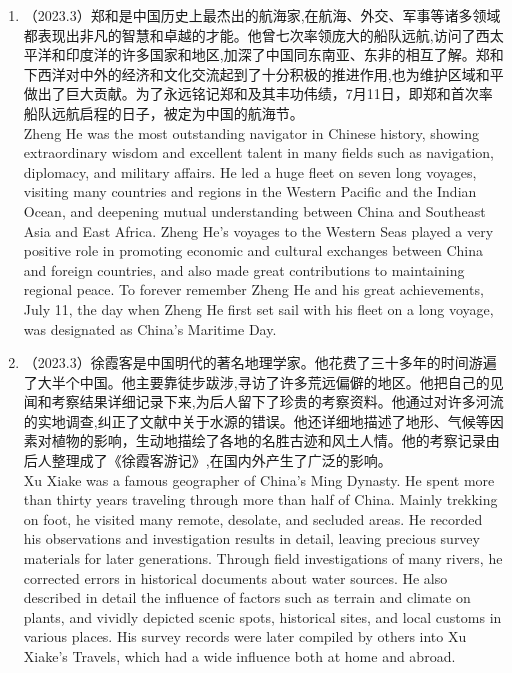 ﻿\documentclass[lang=cn,11pt]{elegantbook}
\begin{document}
\begin{enumerate}
    \item （2023.3）郑和是中国历史上最杰出的航海家,在航海、外交、军事等诸多领域都表现出非凡的智慧和卓越的才能。他曾七次率领庞大的船队远航,访问了西太平洋和印度洋的许多国家和地区,加深了中国同东南亚、东非的相互了解。郑和下西洋对中外的经济和文化交流起到了十分积极的推进作用,也为维护区域和平做出了巨大贡献。为了永远铭记郑和及其丰功伟绩，7月11日，即郑和首次率船队远航启程的日子，被定为中国的航海节。\\Zheng He was the most outstanding navigator in Chinese history, showing extraordinary wisdom and excellent talent in many fields such as navigation, diplomacy, and military affairs. He led a huge fleet on seven long voyages, visiting many countries and regions in the Western Pacific and the Indian Ocean, and deepening mutual understanding between China and Southeast Asia and East Africa. Zheng He’s voyages to the Western Seas played a very positive role in promoting economic and cultural exchanges between China and foreign countries, and also made great contributions to maintaining regional peace. To forever remember Zheng He and his great achievements, July 11, the day when Zheng He first set sail with his fleet on a long voyage, was designated as China’s Maritime Day.
    \item （2023.3）徐霞客是中国明代的著名地理学家。他花费了三十多年的时间游遍了大半个中国。他主要靠徒步跋涉,寻访了许多荒远偏僻的地区。他把自己的见闻和考察结果详细记录下来,为后人留下了珍贵的考察资料。他通过对许多河流的实地调查,纠正了文献中关于水源的错误。他还详细地描述了地形、气候等因素对植物的影响，生动地描绘了各地的名胜古迹和风土人情。他的考察记录由后人整理成了《徐霞客游记》,在国内外产生了广泛的影响。\\Xu Xiake was a famous geographer of China’s Ming Dynasty. He spent more than thirty years traveling through more than half of China. Mainly trekking on foot, he visited many remote, desolate, and secluded areas. He recorded his observations and investigation results in detail, leaving precious survey materials for later generations. Through field investigations of many rivers, he corrected errors in historical documents about water sources. He also described in detail the influence of factors such as terrain and climate on plants, and vividly depicted scenic spots, historical sites, and local customs in various places. His survey records were later compiled by others into Xu Xiake’s Travels, which had a wide influence both at home and abroad.

\end{enumerate}
\end{document}
